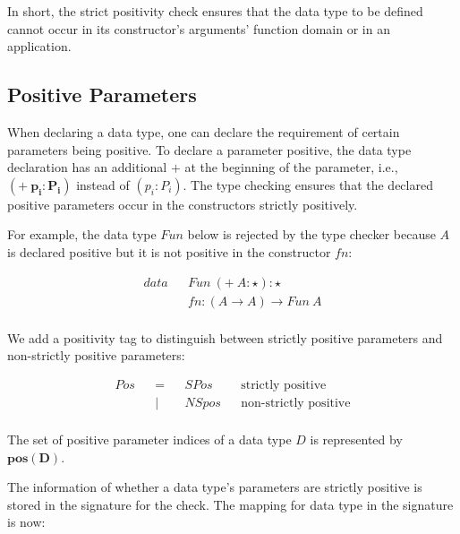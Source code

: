 In short, the strict positivity check ensures that the data type to be defined cannot occur in its constructor's arguments' function domain or in an application.

\subsection{Positive Parameters}

When declaring a data type, one can declare the requirement of certain parameters being positive. To declare a parameter positive, the data type declaration has an additional $\boldsymbol{+}$ at the beginning of the parameter, i.e., $\boldsymbol{(+ \: p_i:P_i)}$ instead of $(p_i : P_i)$. The type checking ensures that the declared positive parameters occur in the constructors strictly positively.

For example, the data type $Fun$ below is rejected by the type checker because $A$ is declared positive but it is not positive in the constructor $fn$:

\begin{figure}[H]
  \begin{equation*}
    \begin{aligned}
      data &  & Fun \: (+ \: A : \star) : \star \\
           &  & fn : (A \to A ) \to Fun \: A    \\
    \end{aligned}
  \end{equation*}
\end{figure}


We add a positivity tag to distinguish between strictly positive parameters and non-strictly positive parameters:

\begin{figure}[H]
  \begin{equation*}
    \begin{aligned}
      Pos &  & = &  & SPos  &  & \textrm{strictly positive}     \\
          &  & | &  & NSpos &  & \textrm{non-strictly positive} \\
    \end{aligned}
  \end{equation*}
\end{figure}

The set of positive parameter indices of a data type $D$ is represented by $\boldsymbol{pos(D)}$.

The information of whether a data type's parameters are strictly positive is stored in the signature for the check. The mapping for data type in the signature is now:

